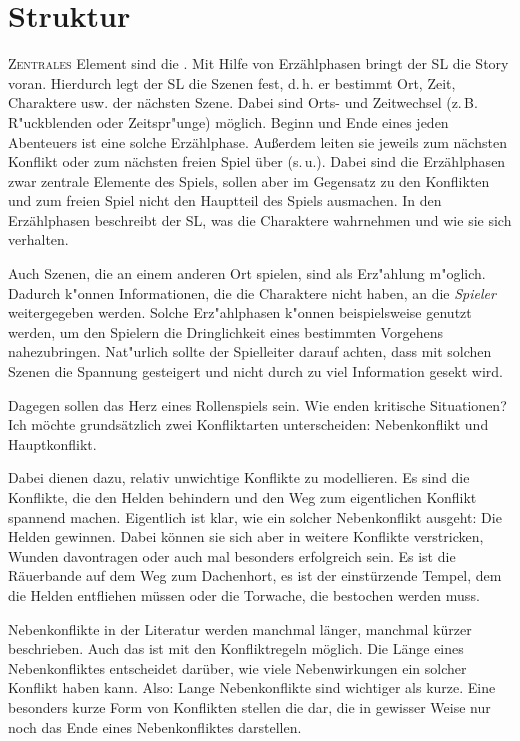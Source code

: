 \chapter{Struktur}\label{Ch:Struktur}
\lettrine{Z}{entrales} Element sind die . Mit Hilfe von Erzählphasen bringt der SL die Story voran. Hierdurch legt der SL die Szenen fest, d.\,h. er bestimmt Ort, Zeit, Charaktere usw. der nächsten Szene. Dabei sind Orts- und Zeitwechsel (z.\,B. R"uckblenden oder Zeitspr"unge) möglich. Beginn und Ende eines jeden Abenteuers ist eine solche Erzählphase. Außerdem leiten sie jeweils zum nächsten Konflikt oder zum nächsten freien Spiel über (s.\,u.). Dabei sind die Erzählphasen zwar zentrale Elemente des Spiels, sollen aber im Gegensatz zu den Konflikten und zum freien Spiel nicht den Hauptteil des Spiels ausmachen. In den Erzählphasen beschreibt der SL, was die Charaktere wahrnehmen und wie sie sich verhalten.

Auch Szenen, die an einem anderen Ort spielen, sind als Erz"ahlung m"oglich. Dadurch k"onnen Informationen, die die Charaktere nicht haben, an die \emph{Spieler} weitergegeben werden. Solche Erz"ahlphasen k"onnen beispielsweise genutzt werden, um den Spielern die Dringlichkeit eines bestimmten Vorgehens nahezubringen. Nat"urlich sollte der Spielleiter darauf achten, dass mit solchen Szenen die Spannung gesteigert und nicht durch zu viel Information gesekt wird.

Dagegen sollen  das Herz eines Rollenspiels sein. Wie enden kritische Situationen? Ich möchte grundsätzlich zwei Konfliktarten unterscheiden: Nebenkonflikt und Hauptkonflikt.

Dabei dienen  dazu, relativ unwichtige Konflikte zu modellieren. Es sind die Konflikte, die den Helden behindern und den Weg zum eigentlichen Konflikt spannend machen. Eigentlich ist klar, wie ein solcher Nebenkonflikt ausgeht: Die Helden gewinnen. Dabei können sie sich aber in weitere Konflikte verstricken, Wunden davontragen oder auch mal besonders erfolgreich sein. Es ist die Räuerbande auf dem Weg zum Dachenhort, es ist der einstürzende Tempel, dem die Helden entfliehen müssen oder die Torwache, die bestochen werden muss.

Nebenkonflikte in der Literatur werden manchmal länger, manchmal kürzer beschrieben. Auch das ist mit den Konfliktregeln möglich. Die Länge eines Nebenkonfliktes entscheidet darüber, wie viele Nebenwirkungen ein solcher Konflikt haben kann. Also: Lange Nebenkonflikte sind wichtiger als kurze. Eine besonders kurze Form von Konflikten stellen die  dar, die in gewisser Weise nur noch das Ende eines Nebenkonfliktes darstellen.

